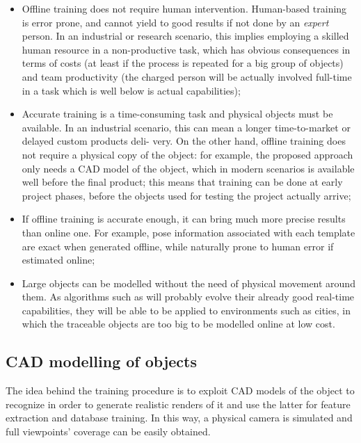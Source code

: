 \begin{itemize}
  \item{Offline training does not require human intervention. Human-based
      training is error prone, and cannot yield to good results if not done by an
      \emph{expert} person. In an industrial or research scenario, this implies
      employing a skilled human resource in a non-productive task, which has obvious
      consequences in terms of costs (at least if the process is repeated
      for a big group of objects) and team productivity (the charged person will be
      actually involved full-time in a task which is well below is actual
    capabilities);}
  \item{Accurate training is a time-consuming task and physical objects must be available. In an
      industrial scenario, this can mean a longer time-to-market or delayed custom products deli-
      very. On the other hand, offline training does not require a physical copy of the object: for
      example, the proposed approach only needs a CAD model of the object, which in modern
      scenarios is available well before the final product; this means that training can be done at
      early project phases, before the objects used for testing the project actually
    arrive;}
  \item{If offline training is accurate enough, it can bring much more precise results than online
      one. For example, pose information associated with each template are exact when generated
    offline, while naturally prone to human error if estimated online;}
  \item{Large objects can be modelled without the need of physical movement around them. As
      algorithms such as \cite{linemod-pipeline} will probably evolve their already good real-time capabilities, they will
      be able to be applied to environments such as cities, in which the traceable objects are too
    big to be modelled online at low cost.}
\end{itemize}

\subsection{CAD modelling of objects} \label{sec:cad-mesh}
The idea behind the training procedure is to exploit CAD models of the object
to recognize in order to generate realistic renders of it and use the latter
for feature extraction and database training. In this way, a physical camera is
simulated and full viewpoints' coverage can be easily obtained.


